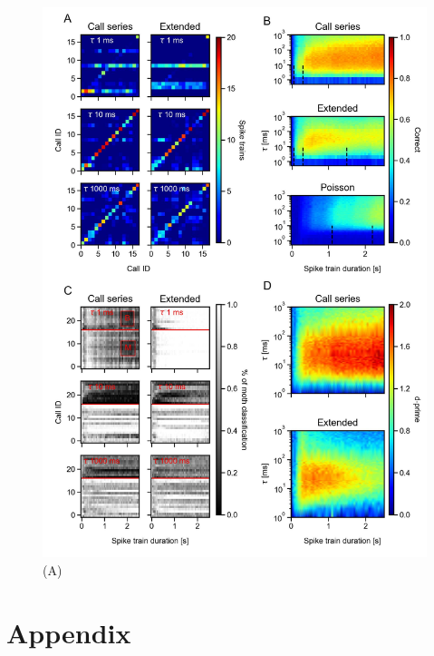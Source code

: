 \documentclass[12pt,a4paper]{article}
\begin{document}
\begin{figure}[h!]
	\centering
	\includegraphics{figures/Fig_03.jpeg}
	\caption{\label{fig:03}(A)}
\end{figure}

\newpage
\section{Appendix}
\end{document}
